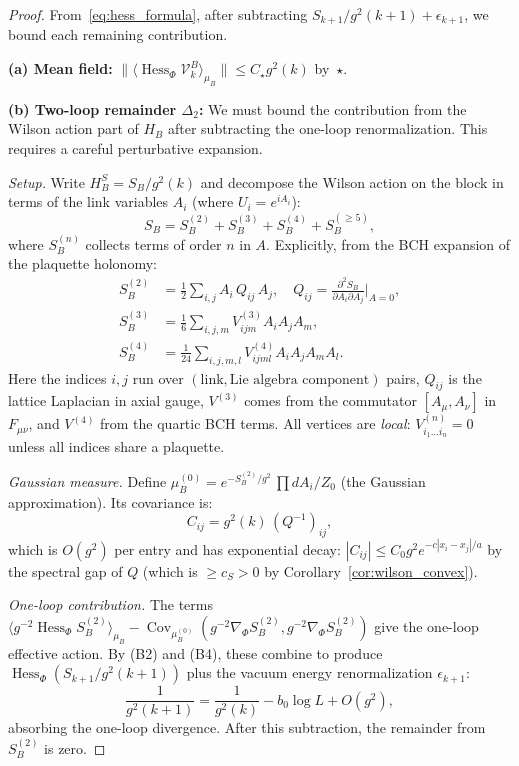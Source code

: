 \documentclass[11pt,a4paper]{article}
\theoremstyle{plain}
\theoremstyle{definition}
\theoremstyle{remark}
\newcommand{\Cov}{\operatorname{Cov}}
\newcommand{\Hess}{\operatorname{Hess}}
\newcommand{\cV}{\mathcal{V}}
\begin{document}
\begin{proof}
From~\eqref{eq:hess_formula}, after subtracting
$S_{k+1}/g^2(k+1) + \epsilon_{k+1}$, we bound each
remaining contribution.

\medskip\noindent
\textbf{(a) Mean field:}
$\|\langle\Hess_\Phi\cV_k^B\rangle_{\mu_B}\|
\le C_\star g^2(k)$ by~$\star$.

\medskip\noindent
\textbf{(b) Two-loop remainder $\Delta_2$:}
We must bound the contribution from the Wilson action part
of $H_B$ after subtracting the one-loop renormalization.
This requires a careful perturbative expansion.

\emph{Setup.} Write $H_B^S = S_B/g^2(k)$ and decompose
the Wilson action on the block in terms of the link
variables $A_i$ (where $U_i = e^{iA_i}$):
\begin{equation}\label{eq:SB_expand}
  S_B = S_B^{(2)} + S_B^{(3)} + S_B^{(4)} + S_B^{(\ge 5)},
\end{equation}
where $S_B^{(n)}$ collects terms of order $n$ in $A$.
Explicitly, from the BCH expansion of the plaquette
holonomy:
\begin{align}
  S_B^{(2)} &= \frac{1}{2}\sum_{i,j} A_i\,
  Q_{ij}\,A_j, \quad
  Q_{ij} = \frac{\partial^2 S_B}{\partial A_i\partial A_j}
  \Big|_{A=0}, \label{eq:SB2}\\
  S_B^{(3)} &= \frac{1}{6}\sum_{i,j,m}
  V_{ijm}^{(3)} A_i A_j A_m, \label{eq:SB3}\\
  S_B^{(4)} &= \frac{1}{24}\sum_{i,j,m,l}
  V_{ijml}^{(4)} A_i A_j A_m A_l. \label{eq:SB4}
\end{align}
Here the indices $i, j$ run over
$({\text{link}}, {\text{Lie algebra component}})$
pairs, $Q_{ij}$ is the lattice Laplacian in axial gauge,
$V^{(3)}$ comes from the commutator $[A_\mu, A_\nu]$
in $F_{\mu\nu}$, and $V^{(4)}$ from the quartic BCH
terms. All vertices are \emph{local}: $V^{(n)}_{i_1\ldots i_n}
= 0$ unless all indices share a plaquette.

\emph{Gaussian measure.} Define
$\mu_B^{(0)} = e^{-S_B^{(2)}/g^2}\,\prod dA_i / Z_0$
(the Gaussian approximation). Its covariance is:
\begin{equation}
  C_{ij} = g^2(k)\,(Q^{-1})_{ij},
\end{equation}
which is $O(g^2)$ per entry and has exponential decay:
$|C_{ij}| \le C_0 g^2 e^{-c|x_i - x_j|/a}$ by the
spectral gap of $Q$ (which is $\ge c_S > 0$ by
Corollary~\ref{cor:wilson_convex}).

\emph{One-loop contribution.} The terms
$\langle g^{-2}\Hess_\Phi S_B^{(2)}\rangle_{\mu_B}
- \Cov_{\mu_B^{(0)}}(g^{-2}\nabla_\Phi S_B^{(2)},
g^{-2}\nabla_\Phi S_B^{(2)})$ give the one-loop
effective action. By (B2) and (B4), these combine to
produce $\Hess_\Phi(S_{k+1}/g^2(k+1))$ plus the
vacuum energy renormalization $\epsilon_{k+1}$:
\begin{equation}
  \frac{1}{g^2(k+1)} = \frac{1}{g^2(k)} - b_0\log L
  + O(g^2),
\end{equation}
absorbing the one-loop divergence. After this
subtraction, the remainder from $S_B^{(2)}$ is zero.


\end{proof}
\end{document}
